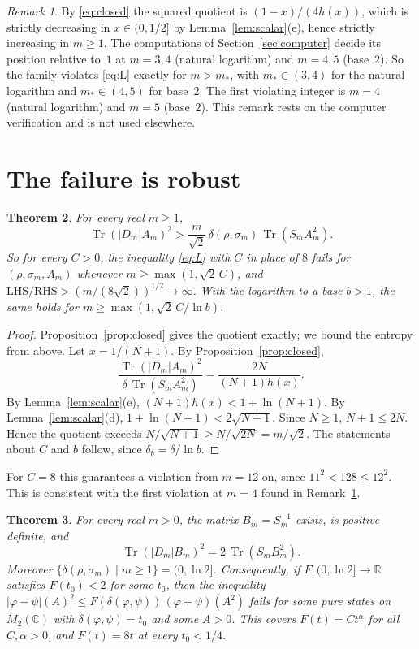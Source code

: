 \documentclass[11pt]{amsart}
\newtheorem{theorem}{Theorem}[section]
\theoremstyle{definition}\newtheorem{definition}[theorem]{Definition}
\theoremstyle{remark}\newtheorem{remark}[theorem]{Remark}
\DeclareMathOperator{\Tr}{Tr}
\newcommand{\C}{\mathbb{C}}
\newcommand{\R}{\mathbb{R}}
\newcommand{\abs}[1]{\lvert #1\rvert}
\newcommand{\LHS}{\mathrm{LHS}}
\newcommand{\RHS}{\mathrm{RHS}}
\begin{document}
\begin{remark}\label{rem:threshold}
By \eqref{eq:closed} the squared quotient is \((1-x)/(4h(x))\), which is strictly decreasing in \(x\in(0,1/2]\) by Lemma~\ref{lem:scalar}(e), hence strictly increasing in \(m\ge1\). The computations of Section~\ref{sec:computer} decide its position relative to~\(1\) at \(m=3,4\) (natural logarithm) and \(m=4,5\) (base~\(2\)). So the family violates \eqref{eq:L} exactly for \(m>m_\ast\), with \(m_\ast\in(3,4)\) for the natural logarithm and \(m_\ast\in(4,5)\) for base~\(2\). The first violating integer is \(m=4\) (natural logarithm) and \(m=5\) (base~\(2\)). This remark rests on the computer verification and is not used elsewhere.
\end{remark}

\section{The failure is robust}\label{sec:robust}

\begin{theorem}\label{thm:noconst}
For every real \(m\ge1\),
\[
\Tr(\abs{D_m}A_m)^2>\frac{m}{\sqrt2}\,\delta(\rho,\sigma_m)\,\Tr(S_mA_m^2).
\]
So for every \(C>0\), the inequality \eqref{eq:L} with \(C\) in place of \(8\) fails for \((\rho,\sigma_m,A_m)\) whenever \(m\ge\max(1,\sqrt2\,C)\), and \(\LHS/\RHS>(m/(8\sqrt2))^{1/2}\to\infty\). With the logarithm to a base \(b>1\), the same holds for \(m\ge\max(1,\sqrt2\,C/\ln b)\).
\end{theorem}

\begin{proof}
Proposition~\ref{prop:closed} gives the quotient exactly; we bound the entropy from above. Let \(x=1/(N+1)\). By Proposition~\ref{prop:closed},
\[
\frac{\Tr(\abs{D_m}A_m)^2}{\delta\,\Tr(S_mA_m^2)}=\frac{2N}{(N+1)h(x)} .
\]
By Lemma~\ref{lem:scalar}(e), \((N+1)h(x)<1+\ln(N+1)\). By Lemma~\ref{lem:scalar}(d), \(1+\ln(N+1)<2\sqrt{N+1}\). Since \(N\ge1\), \(N+1\le2N\). Hence the quotient exceeds \(N/\sqrt{N+1}\ge N/\sqrt{2N}=m/\sqrt2\). The statements about \(C\) and \(b\) follow, since \(\delta_b=\delta/\ln b\).
\end{proof}

For \(C=8\) this guarantees a violation from \(m=12\) on, since \(11^2<128\le12^2\). This is consistent with the first violation at \(m=4\) found in Remark~\ref{rem:threshold}.

\begin{theorem}\label{thm:nofunction}
For every real \(m>0\), the matrix \(B_m=S_m^{-1}\) exists, is positive definite, and
\[
\Tr(\abs{D_m}B_m)^2=2\,\Tr(S_mB_m^2).
\]
Moreover \(\{\delta(\rho,\sigma_m)\mid m\ge1\}=(0,\ln2]\). Consequently, if \(F\colon(0,\ln2]\to\R\) satisfies \(F(t_0)<2\) for some \(t_0\), then the inequality \(\abs{\varphi-\psi}(A)^2\le F(\delta(\varphi,\psi))\,(\varphi+\psi)(A^2)\) fails for some pure states on \(M_2(\C)\) with \(\delta(\varphi,\psi)=t_0\) and some \(A>0\). This covers \(F(t)=Ct^\alpha\) for all \(C,\alpha>0\), and \(F(t)=8t\) at every \(t_0<1/4\).
\end{theorem}
\end{document}
